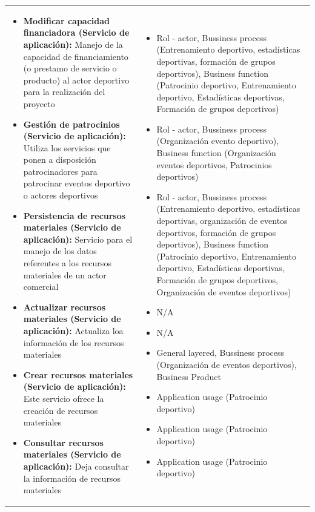 \begin{table}[!htb]
\begin{center}
{\begin{tabular}{|p{7cm}|p{4cm}|}
\begin{itemize}
				\item \textbf{Modificar capacidad financiadora (Servicio de aplicación):} Manejo de la capacidad de financiamiento (o prestamo de servicio o producto) al actor deportivo para la realización del proyecto
				\item \textbf{Gestión de patrocinios (Servicio de aplicación):} Utiliza los servicios que ponen a disposición patrocinadores para patrocinar eventos deportivo o actores deportivos
				\item \textbf{Persistencia de recursos materiales (Servicio de aplicación):} Servicio para el manejo de los datos referentes a los recursos materiales de un actor comercial
				\item \textbf{Actualizar recursos materiales (Servicio de aplicación):} Actualiza loa información de los recursos materiales
				\item \textbf{Crear recursos materiales (Servicio de aplicación):} Este servicio ofrece la creación de recursos materiales
				\item \textbf{Consultar recursos materiales (Servicio de aplicación):} Deja consultar la información de recursos materiales
			\end{itemize} 
			&
			\begin{itemize}
				\item Rol - actor, Bussiness process (Entrenamiento deportivo, estadísticas deportivas, formación de grupos deportivos), Business function (Patrocinio deportivo, Entrenamiento deportivo, Estadísticas deportivas, Formación de grupos deportivos)
				\item Rol - actor, Bussiness process (Organización evento deportivo), Business function (Organización eventos deportivos, Patrocinios deportivos)
				\item Rol - actor, Bussiness process (Entrenamiento deportivo, estadísticas deportivas, organización de eventos deportivos, formación de grupos deportivos), Business function (Patrocinio deportivo, Entrenamiento deportivo, Estadísticas deportivas, Formación de grupos deportivos, Organización de eventos deportivos)
				\item N/A
				\item N/A
				\item General layered, Bussiness process (Organización de eventos deportivos), Business Product
				\item Application usage (Patrocinio deportivo)
				\item Application usage (Patrocinio deportivo)
				\item Application usage (Patrocinio deportivo)

\end{itemize}
\end{tabular}}
\end{center}
\end{table}
